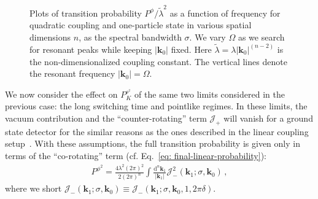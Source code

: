 \documentclass[prd,twocolumn,superscriptaddress,nofootinbib,floatfix,amsmath,amssymb]{revtex4-2}
\newcommand{\bk}{{\bm{k}}}
\newcommand{\dd}{\textrm{d}}
\begin{document}
\begin{figure}[htp]
        \caption{
        Plots of transition probability $P^\phi/\tilde{\lambda}^2$ as a function of frequency for quadratic coupling and one-particle state in various spatial dimensions $n$, as the spectral bandwidth $\sigma$. We vary $\Omega$ as we search for resonant peaks while keeping $|\bk_0|$ fixed. Here $\tilde\lambda = \lambda|\bk_0|^{(n-2)}$ is the non-dimensionalized coupling constant. The vertical lines denote the resonant frequency $|\bk_0|=\Omega$.
        }
    \label{fig: quad_resonance1}
    \end{figure}
    	
    We now consider the effect on $P_K^{_{\phi^2}}$ of the same two limits considered in the previous case: the long switching time and pointlike regimes. In these limits, the vacuum contribution and the ``counter-rotating'' term $\mathcal{J}_+$  will vanish for a ground state detector for the similar reasons as the ones described in the linear coupling setup~\cite{Allison2017a}. With these assumptions, the full transition probability is given only in terms of the ``co-rotating'' term (cf. Eq.~\eqref{eq: final-linear-probability}):
	\begin{align}
	    P^{\phi^2} = \frac{4\lambda^2(2\pi)^2}{2(2\pi)^n}\int \frac{\dd^n\bk_1}{|\bk_1|}\mathcal{J}^2_-(\bk_1; \sigma,\bk_0)\,,
    	\label{eq: final-quad-probability}
    \end{align}
    where we short $\mathcal{J}_-(\bk_1; \sigma,\bk_0)\equiv \mathcal{J}_-(\bk_1; \sigma,\bk_0, 1,2\pi\delta )$.
    
\end{document}
